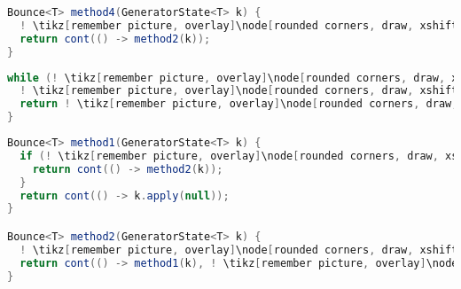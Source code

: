 \begin{center}
\begin{mdframed}[topline=true]
\begin{minipage}[t]{0.6\textwidth}
\begin{lstlisting}[language=Java, numbers=none, breaklines=true]
Bounce<T> method4(GeneratorState<T> k) {
  ! \tikz[remember picture, overlay]\node[rounded corners, draw, xshift=-0.1cm, inner sep=5pt, anchor=west] {Frissít}; \vspace*{0.3cm} !
  return cont(() -> method2(k));
}
\end{lstlisting} 
\end{minipage}
\end{mdframed}
\end{center}

\pagebreak

\begin{center}
\begin{mdframed}[topline=true]
\begin{minipage}[t]{0.4\textwidth}
\begin{lstlisting}[language=Java, numbers=none, breaklines=true]
while (! \tikz[remember picture, overlay]\node[rounded corners, draw, xshift=-0.1cm, inner sep=5pt, anchor=west, yshift=0.1cm] {Feltétel}; \vspace*{0.3cm} \hspace*{1.14cm}!) {
  ! \tikz[remember picture, overlay]\node[rounded corners, draw, xshift=-0.1cm, inner sep=5pt, anchor=west] {Kódrészlet}; \vspace*{0.5cm} ! 
  return ! \tikz[remember picture, overlay]\node[rounded corners, draw, xshift=-0.1cm, inner sep=5pt, anchor=west, yshift=0.1cm] {Kifejezés}; \vspace*{0.3cm} !
}
\end{lstlisting}
\end{minipage} 
\begin{minipage}[t]{0.6\textwidth}
\begin{lstlisting}[language=Java, numbers=none, breaklines=true]
Bounce<T> method1(GeneratorState<T> k) {
  if (! \tikz[remember picture, overlay]\node[rounded corners, draw, xshift=-0.1cm, inner sep=5pt, anchor=west, yshift=0.1cm] {Feltétel}; \hspace*{1.04cm} !) {
    return cont(() -> method2(k));
  }
  return cont(() -> k.apply(null));
}

Bounce<T> method2(GeneratorState<T> k) {
  ! \tikz[remember picture, overlay]\node[rounded corners, draw, xshift=-0.1cm, inner sep=5pt, anchor=west] {Kódrészlet}; \vspace*{0.3cm} !
  return cont(() -> method1(k), ! \tikz[remember picture, overlay]\node[rounded corners, draw, xshift=-0.1cm, inner sep=5pt, anchor=west, yshift=0.1cm] {Kifejezés}; \vspace*{0.2cm} \hspace*{1.2cm} !);
}
\end{lstlisting} 
\end{minipage}
\end{mdframed}
\end{center}

